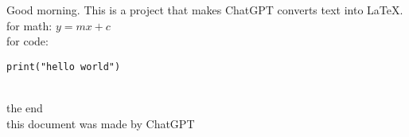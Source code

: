 \documentclass{article}
\begin{document}
\noindent Good morning. This is a project that makes ChatGPT converts text into \LaTeX.\\

\noindent for math: $y = mx + c$\\

\noindent for code:\\

\begin{verbatim}
print("hello world")
\end{verbatim}\\

\noindent the end\\

\noindent this document was made by ChatGPT
\end{document}
